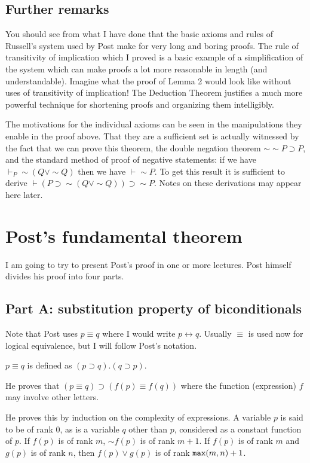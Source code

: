 \documentclass[12pt]{article}
\begin{document}
\subsection{Further remarks}

You should see from what I have done that the basic axioms and rules of Russell's system used by Post make for very long and boring proofs.  The rule of transitivity of implication which 
I proved is a basic example of a simplification of the system which can make proofs a lot more reasonable in length (and understandable).  Imagine what the proof of Lemma 2 would look like without uses of transitivity of implication!  The Deduction Theorem justifies a much more powerful technique for shortening proofs and organizing them intelligibly.

The motivations for the individual axioms can be seen in the manipulations they enable in the proof above.  That they are a sufficient set is actually witnessed by the fact that we can prove this theorem, the double negation theorem $\sim \sim P \supset P$,  and the standard method  of proof of negative statements:  if we have $\vdash_P \sim(Q \vee \sim Q)$ then we have $\vdash \sim P$.  To get this result it is sufficient to
derive $\vdash (P \supset \sim(Q \vee \sim Q)) \supset \sim P$.  Notes on these derivations may appear here later.

\section{Post's fundamental theorem}

I am going to try to present Post's proof in one or more lectures.  Post himself divides his proof into four parts.

\subsection{Part A:  substitution property of biconditionals}

Note that Post uses $p \equiv q$ where I would write $p \leftrightarrow q$.  Usually $\equiv$ is used now for logical equivalence, but I will follow Post's notation.

$p \equiv q$ is defined as $(p \supset q).(q \supset p)$.

He proves that $(p \equiv q) \supset (f(p) \equiv f(q))$  where the function (expression) $f$ may involve other letters.

He proves this by induction on the complexity of expressions.  A variable $p$ is said to be of rank 0, as is a variable $q$ other than $p$, considered as a constant function of $p$.  If $f(p)$ is of rank $m$, $\sim f(p)$ is of rank $m+1$.
If $f(p)$ is of rank $m$ and $g(p)$ is of rank $n$, then $f(p) \vee g(p)$ is of rank ${\tt max}(m,n)+1$.
\end{document}
